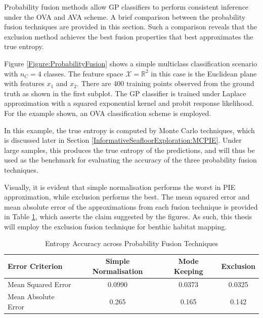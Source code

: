 				Probability fusion methods allow GP classifiers to perform consistent inference under the OVA and AVA scheme. A brief comparison between the probability fusion techniques are provided in this section. Such a comparison reveals that the exclusion method achieves the best fusion properties that best approximates the true entropy.
						
				Figure \ref{Figure:ProbabilityFusion} shows a simple multiclass classification scenario with $n_{C} = 4$ classes. The feature space $\mathcal{X} = \mathbb{R}^{2}$ in this case is the Euclidean plane with features $x_{1}$ and $x_{2}$. There are 400 training points observed from the ground truth as shown in the first subplot. The GP classifier is trained under Laplace approximation with a squared exponential kernel and probit response likelihood. For the example shown, an OVA classification scheme is employed.
				
				In this example, the true entropy is computed by Monte Carlo techniques, which is discussed later in Section \ref{InformativeSeafloorExploration:MCPIE}. Under large samples, this produces the true entropy of the predictions, and will thus be used as the benchmark for evaluating the accuracy of the three probability fusion techniques.
				
				Visually, it is evident that simple normalisation performs the worst in PIE approximation, while exclusion performs the best. The mean squared error and mean absolute error of the approximations from each fusion technique is provided in Table \ref{Table:ProbabilityFusionAccuracy}, which asserts the claim suggested by the figures. As such, this thesis will employ the exclusion fusion technique for benthic habitat mapping.
						
				\begin{table}[t]
					{\footnotesize
					\begin{center}
						\begin{tabular}{ l c c c }
						\hline
						Error Criterion & Simple Normalisation & Mode Keeping & Exclusion \\
						\hline
						Mean Squared Error & 0.0990 & 0.0373 & 0.0325 \\
						Mean Absolute Error & 0.265 & 0.165 & 0.142 \\
						\hline
						\end{tabular}
					\end{center}
					}
			  	\caption{Entropy Accuracy across Probability Fusion Techniques}
			  	\label{Table:ProbabilityFusionAccuracy}
			  	\end{table}	

